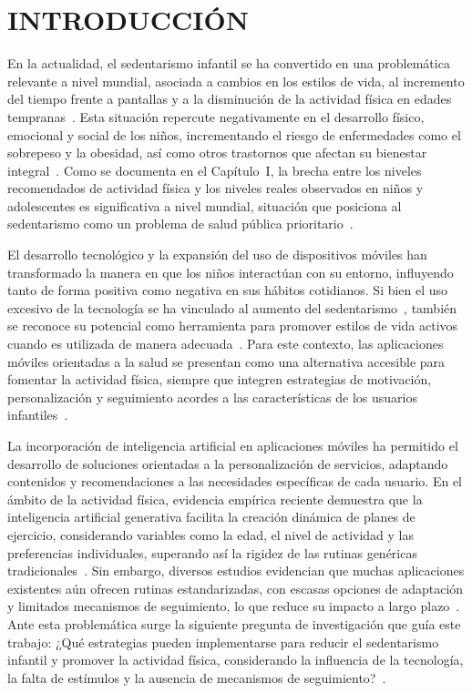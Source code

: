 	\chapter*{INTRODUCCIÓN}
		En la actualidad, el sedentarismo infantil se ha convertido en una problemática relevante a nivel mundial, asociada a cambios en los estilos de vida, al incremento del tiempo frente a pantallas y a la disminución de la actividad física en edades tempranas~\cite{Guthold2020}. Esta situación repercute negativamente en el desarrollo físico, emocional y social de los niños, incrementando el riesgo de enfermedades como el sobrepeso y la obesidad, así como otros trastornos que afectan su bienestar integral~\cite{Musa2022}. Como se documenta en el Capítulo~I, la brecha entre los niveles recomendados de actividad física y los niveles reales observados en niños y adolescentes es significativa a nivel mundial, situación que posiciona al sedentarismo como un problema de salud pública prioritario~\cite{Bull2020}.
	
		El desarrollo tecnológico y la expansión del uso de dispositivos móviles han transformado la manera en que los niños interactúan con su entorno, influyendo tanto de forma positiva como negativa en sus hábitos cotidianos. Si bien el uso excesivo de la tecnología se ha vinculado al aumento del sedentarismo~\cite{Musa2022}, también se reconoce su potencial como herramienta para promover estilos de vida activos cuando es utilizada de manera adecuada~\cite{Direito2017}. Para este contexto, las aplicaciones móviles orientadas a la salud se presentan como una alternativa accesible para fomentar la actividad física, siempre que integren estrategias de motivación, personalización y seguimiento acordes a las características de los usuarios infantiles~\cite{Zhu2024}.
	
		La incorporación de inteligencia artificial en aplicaciones móviles ha permitido el desarrollo de soluciones orientadas a la personalización de servicios, adaptando contenidos y recomendaciones a las necesidades específicas de cada usuario. En el ámbito de la actividad física, evidencia empírica reciente demuestra que la inteligencia artificial generativa facilita la creación dinámica de planes de ejercicio, considerando variables como la edad, el nivel de actividad y las preferencias individuales, superando así la rigidez de las rutinas genéricas tradicionales~\cite{Pareek2025}. Sin embargo, diversos estudios evidencian que muchas aplicaciones existentes aún ofrecen rutinas estandarizadas, con escasas opciones de adaptación y limitados mecanismos de seguimiento, lo que reduce su impacto a largo plazo~\cite{Direito2017,Zhu2024}. Ante esta problemática surge la siguiente pregunta de investigación que guía este trabajo: ¿Qué estrategias pueden implementarse para reducir el sedentarismo infantil y promover la actividad física, considerando la influencia de la tecnología, la falta de estímulos y la ausencia de mecanismos de seguimiento?~\cite{Bull2020}.
	
